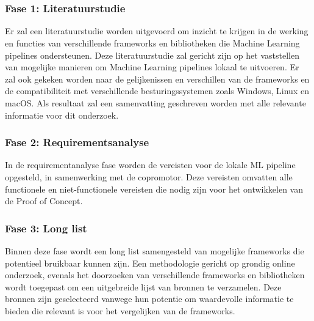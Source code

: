 
\chapter{}%
\label{ch:methodologie}


\subsection{Fase 1: Literatuurstudie}
Er zal een literatuurstudie worden uitgevoerd om inzicht te krijgen in de werking en
functies van verschillende frameworks en bibliotheken die Machine Learning pipelines ondersteunen.
Deze literatuurstudie zal gericht zijn op het vaststellen van mogelijke manieren om Machine Learning pipelines lokaal te uitvoeren. Er zal ook gekeken worden naar de gelijkenissen en verschillen van de frameworks en de compatibiliteit met verschillende besturingssystemen zoals Windows, Linux en macOS.
Als resultaat zal een samenvatting geschreven worden met alle relevante informatie voor dit onderzoek.
\subsection{Fase 2: Requirementsanalyse}
In de requirementanalyse fase worden de vereisten voor de lokale ML pipeline opgesteld, in samenwerking met de copromotor. Deze vereisten omvatten alle functionele en niet-functionele vereisten die nodig zijn voor het ontwikkelen van de Proof of Concept.

\subsection{Fase 3: Long list}
Binnen deze fase wordt een long list samengesteld van mogelijke frameworks die potentieel bruikbaar kunnen zijn. Een methodologie gericht op grondig online onderzoek, evenals het doorzoeken van verschillende frameworks en bibliotheken wordt toegepast om een uitgebreide lijst van bronnen te verzamelen. Deze bronnen zijn geselecteerd vanwege hun potentie om waardevolle informatie te bieden die relevant is voor het vergelijken van de frameworks.
